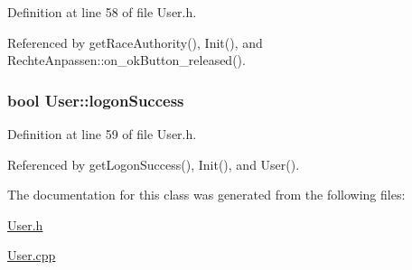 Definition at line 58 of file User.h.

Referenced by getRaceAuthority(), Init(), and RechteAnpassen::on\_\-okButton\_\-released().\hypertarget{class_user_62dd92fabb3f0cf42c9cebbb7875b879}{
\subsubsection[logonSuccess]{\setlength{\rightskip}{0pt plus 5cm}bool {\bf User::logonSuccess}}}
\label{class_user_62dd92fabb3f0cf42c9cebbb7875b879}




Definition at line 59 of file User.h.

Referenced by getLogonSuccess(), Init(), and User().

The documentation for this class was generated from the following files:\begin{CompactItemize}
\item 
\hyperlink{_user_8h}{User.h}\item 
\hyperlink{_user_8cpp}{User.cpp}\end{CompactItemize}
